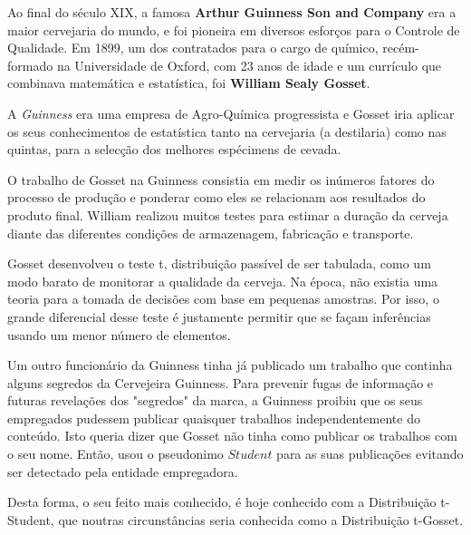 Ao final do século XIX, a famosa \textbf{Arthur Guinness Son and Company} era a maior cervejaria do mundo, e foi pioneira em diversos esforços para o Controle de Qualidade. Em 1899, um dos contratados para o cargo de químico, recém-formado na Universidade de Oxford, com 23 anos de idade e um currículo que combinava matemática e estatística, foi \textbf{William Sealy Gosset}.\vskip0.3cm



A \textit{Guinness} era uma empresa de Agro-Química progressista e Gosset iria aplicar os seus conhecimentos de estatística tanto na cervejaria (a destilaria) como nas quintas, para a selecção dos melhores espécimens de cevada.\vskip0.3cm

\newpage
O trabalho de Gosset na Guinness consistia em medir os inúmeros fatores do processo de produção e ponderar como eles se relacionam aos resultados do produto final. William realizou muitos testes para estimar a duração da cerveja diante das diferentes condições de armazenagem, fabricação e transporte.\vskip0.3cm


Gosset desenvolveu o teste t, distribuição passível de ser tabulada, como um modo barato de monitorar a qualidade da cerveja. Na época, não existia uma teoria para a tomada de decisões com base em pequenas amostras. Por isso, o grande diferencial desse teste é justamente permitir que se façam inferências usando um menor número de elementos. \vskip0.3cm

Um outro funcionário da Guinness tinha já publicado um trabalho que continha alguns segredos da Cervejeira Guinness. Para prevenir fugas de informação e futuras revelações dos "segredos" da marca, a Guinness proibiu que os seus empregados pudessem publicar quaisquer trabalhos independentemente do conteúdo. Isto queria dizer que Gosset não tinha como publicar os trabalhos com o seu nome. Então, usou o pseudonimo $Student$ para as suas publicações evitando ser detectado pela entidade empregadora. \vskip0.3cm

Desta forma, o seu feito mais conhecido, é hoje conhecido com a Distribuição t-Student, que noutras circunstâncias seria conhecida como a Distribuição t-Gosset.\vskip0.3cm


